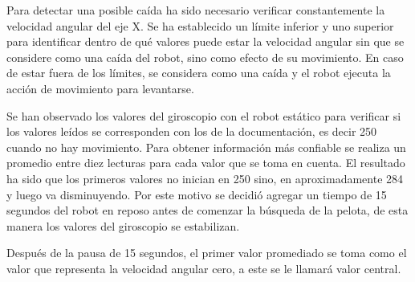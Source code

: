Para detectar una posible caída ha sido necesario verificar constantemente la velocidad angular del eje X. Se ha establecido un límite inferior y uno superior para identificar dentro de qué valores puede estar la velocidad angular sin que se considere como una caída del robot, sino como efecto de su movimiento. En caso de estar fuera de los límites, se considera como una caída y el robot ejecuta la acción de movimiento para levantarse.  

Se han observado los valores del giroscopio con el robot estático para verificar si los valores leídos se corresponden con los de la documentación, es decir 250 cuando no hay movimiento. Para obtener información más confiable se realiza un promedio entre diez lecturas para cada valor que se toma en cuenta. El resultado ha sido que los primeros valores no inician en 250 sino, en aproximadamente 284 y luego va disminuyendo. Por este motivo se decidió agregar un tiempo de 15 segundos del robot en reposo antes de comenzar la búsqueda de la pelota, de esta manera los valores del giroscopio se estabilizan. 


Después de la pausa de 15 segundos, el primer valor promediado se toma como el valor que representa la velocidad angular cero, a este se le llamará valor central.   

